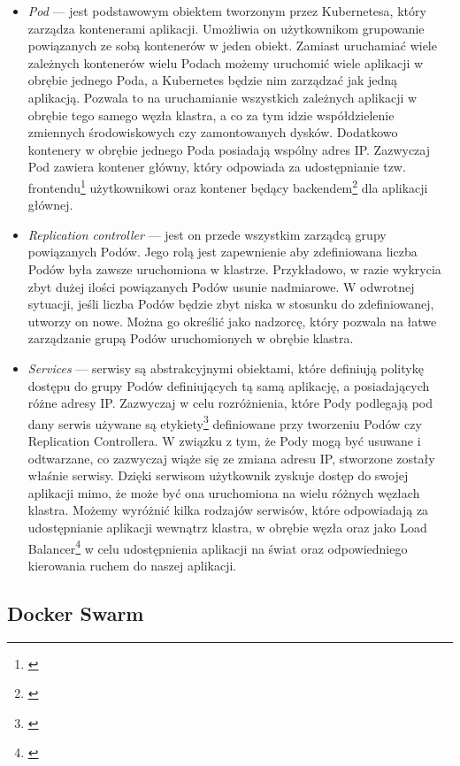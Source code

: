 \documentclass[12pt]{report}
\let\Oldsubsection\subsection
\renewcommand{\subsection}{\FloatBarrier\Oldsubsection}
\begin{document}
{\begin{itemize}
\item{{\it Pod} --- jest podstawowym obiektem tworzonym przez Kubernetesa, który zarządza kontenerami aplikacji. Umożliwia on użytkownikom grupowanie powiązanych ze sobą kontenerów w jeden obiekt. Zamiast uruchamiać wiele zależnych kontenerów wielu Podach możemy uruchomić wiele aplikacji w obrębie jednego Poda, a Kubernetes będzie nim zarządzać jak jedną aplikacją. Pozwala to na uruchamianie wszystkich zależnych aplikacji w obrębie tego samego węzła klastra, a co za tym idzie współdzielenie zmiennych środowiskowych czy zamontowanych dysków. Dodatkowo kontenery w obrębie jednego Poda posiadają wspólny adres IP. Zazwyczaj Pod zawiera kontener główny, który odpowiada za udostępnianie tzw. frontendu\footnote{\cite{frontend}} użytkownikowi oraz kontener będący backendem\footnote{\cite{backend}} dla aplikacji głównej.}

\item{{\it Replication controller} --- jest on przede wszystkim zarządcą grupy powiąza\-nych Podów. Jego rolą jest zapewnienie aby zdefiniowana liczba Podów była zawsze uruchomiona w klastrze. Przykładowo, w razie wykrycia zbyt dużej ilości powiązanych Podów usunie nadmiarowe. W odwrotnej sytuacji, jeśli liczba Podów będzie zbyt niska w stosunku do zdefiniowanej, utworzy on nowe. Można go określić jako nadzorcę, który pozwala na łatwe zarządzanie grupą Podów uruchomionych w obrębie klastra.}

\item{{\it Services} --- serwisy są abstrakcyjnymi obiektami, które definiują politykę dostępu do grupy Podów definiujących tą samą aplikację, a posiadających różne adresy IP. Zazwyczaj w celu rozróżnienia, które Pody podlegają pod dany serwis używane są etykiety\footnote{\cite{label}} definiowane przy tworzeniu Podów czy Replication Controllera. W związku z tym, że Pody mogą być usuwane i odtwarzane, co zazwyczaj wiąże się ze zmiana adresu IP, stworzone zostały właśnie serwisy. Dzięki serwisom użytkownik zyskuje dostęp do swojej aplikacji mimo, że może być ona uruchomiona na wielu różnych węzłach klastra. Możemy wyróżnić kilka rodzajów serwisów, które odpowiadają za udostępnianie aplikacji wewnątrz klastra, w obrębie węzła oraz jako Load Balancer\footnote{\cite{loadbalancer}} w celu udostępnienia aplikacji na świat oraz odpowiedniego kierowania ruchem do naszej aplikacji.}
\end{itemize}

\subsection{Docker Swarm}

}
\end{document}
